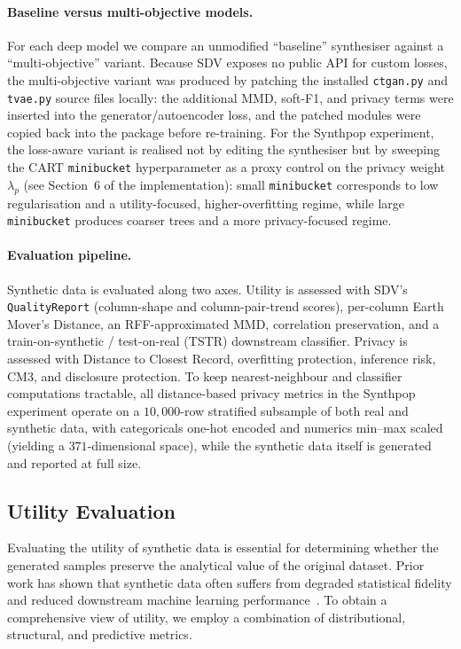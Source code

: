 \documentclass[11pt]{article}
\begin{document}
\paragraph{Baseline versus multi-objective models.} For each deep model we compare an unmodified ``baseline'' synthesiser against a ``multi-objective'' variant. Because SDV exposes no public API for custom losses, the multi-objective variant was produced by patching the installed \texttt{ctgan.py} and \texttt{tvae.py} source files locally: the additional MMD, soft-F1, and privacy terms were inserted into the generator/autoencoder loss, and the patched modules were copied back into the package before re-training. For the Synthpop experiment, the loss-aware variant is realised not by editing the synthesiser but by sweeping the CART \texttt{minibucket} hyperparameter as a proxy control on the privacy weight $\lambda_p$ (see Section~6 of the implementation): small \texttt{minibucket} corresponds to low regularisation and a utility-focused, higher-overfitting regime, while large \texttt{minibucket} produces coarser trees and a more privacy-focused regime.

\paragraph{Evaluation pipeline.} Synthetic data is evaluated along two axes. Utility is assessed with SDV's \texttt{QualityReport} (column-shape and column-pair-trend scores), per-column Earth Mover's Distance, an RFF-approximated MMD, correlation preservation, and a train-on-synthetic / test-on-real (TSTR) downstream classifier. Privacy is assessed with Distance to Closest Record, overfitting protection, inference risk, CM3, and disclosure protection. To keep nearest-neighbour and classifier computations tractable, all distance-based privacy metrics in the Synthpop experiment operate on a $10{,}000$-row stratified subsample of both real and synthetic data, with categoricals one-hot encoded and numerics min--max scaled (yielding a $371$-dimensional space), while the synthetic data itself is generated and reported at full size.

\subsection{Utility Evaluation}

Evaluating the utility of synthetic data is essential for determining whether the generated samples preserve the analytical value of the original dataset. Prior work has shown that synthetic data often suffers from degraded statistical fidelity and reduced downstream machine learning performance~\cite{little2025synthetic}. To obtain a comprehensive view of utility, we employ a combination of distributional, structural, and predictive metrics.
\end{document}
